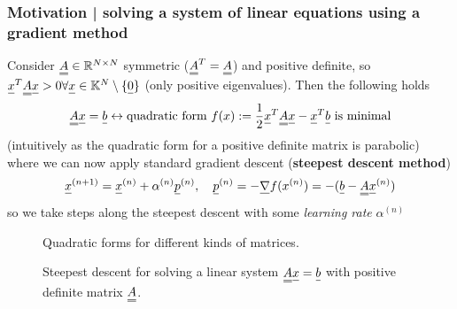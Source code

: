 \subsubsection{Motivation | solving a system of linear equations using a gradient method}
Consider $\mat{A} \in \mathbb{R}^{N \times N}$ symmetric ($\mat{A}^T = \mat{A}$) and positive definite, so $\vec{x}^T \mat{A} \vec{x} > 0 \forall \vec{x}\in \mathbb{K}^N \setminus \{\vec{0}\}$ (only positive eigenvalues).
Then the following holds
\begin{equation}
    \mat{A}\vec{x} = \vec{b} \leftrightarrow \text{quadratic form } f(x) := \frac{1}{2} \vec{x}^T \mat{A} \vec{x} - \vec{x}^T \vec{b} \text{ is minimal}
\end{equation}
(intuitively as the quadratic form for a positive definite matrix is parabolic) where we can now apply standard gradient descent (\textbf{steepest descent method})
\begin{equation}
    \vec{x}^{(n+1)} = \vec{x}^{(n)} + \alpha^{(n)} \vec{p}^{(n)}, \quad \vec{p}^{(n)} = - \vec{\nabla} f(x^{(n)}) = - (\vec{b} - \mat{A} \vec{x}^{(n)})
\end{equation}
so we take steps along the steepest descent with some \textit{learning rate } $\alpha^{(n)}$


\begin{figure}[H]
    \centering
    
    \caption{Quadratic forms for different kinds of matrices.}
    \label{fig:quad_form}
\end{figure}


\begin{figure}[H]
    \centering
    
    \caption{Steepest descent for solving a linear system $\mat{A}\vec{x} = \vec{b}$ with positive definite matrix $\mat{A}$.}
    \label{fig:steepest_descent}
\end{figure}

